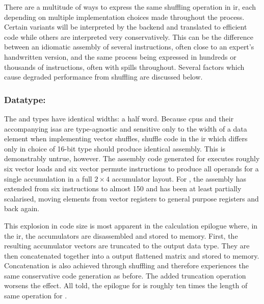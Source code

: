 \documentclass[\main/thesis.tex]{subfiles}
\begin{document}
There are a multitude of ways to express the same shuffling operation in \gls{ir}, each depending on multiple implementation choices made throughout the process.
Certain variants will be interpreted by the backend and translated to efficient code while others are interpreted very conservatively.
This can be the difference between an idiomatic assembly of several instructions, often close to an expert's handwritten version, and the same process being expressed in hundreds or thousands of instructions, often with \glspl{spill} throughout.
Several factors which cause degraded performance from shuffling are discussed below.

\subsubsection{Datatype: \texorpdfstring{}{half}}
The  and  types have identical widths: a half word.
Because \glspl{cpu} and their accompanying \glspl{isa} are type-agnostic and sensitive only to the width of a data element when implementing vector shuffles, shuffle code in the \gls{ir} which differs only in choice of 16-bit type should produce identical assembly.
This is demonstrably untrue, however.
The assembly code generated for  executes roughly six vector loads and six vector permute instructions to produce all operands for a single accumulation in a full $2 \times 4$ accumulator layout.
For , the assembly has extended from six instructions to almost 150 and has been at least partially scalarised, moving elements from vector registers to general purpose registers and back again.

This explosion in code size is most apparent in the calculation epilogue where, in the \gls{ir}, the accumulators are disassembled and stored to memory.
First, the resulting accumulator vectors are truncated to the output data type.
They are then concatenated together into a output flattened matrix and stored to memory.
Concatenation is also achieved through shuffling and therefore experiences the same conservative code generation as before.
The added truncation operation worsens the effect.
All told, the epilogue for  is roughly ten times the length of same operation for .
\end{document}
